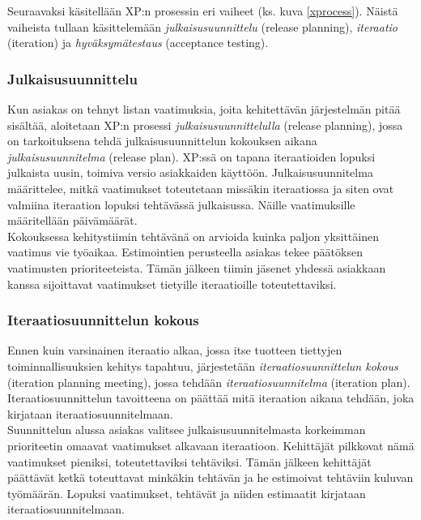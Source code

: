 \documentclass[finnish]{../tktltiki2}
\theoremstyle{definition}
\theoremstyle{remark}
\begin{document}
Seuraavaksi käsitellään XP:n prosessin eri vaiheet (ks. kuva \ref{xprocess}). Näistä vaiheista tullaan käsittelemään \emph{julkaisusuunnittelu} (release planning), \emph{iteraatio} (iteration) ja \emph{hyväksymätestaus} (acceptance testing).

\subsubsection{Julkaisusuunnittelu}

Kun asiakas on tehnyt listan vaatimuksia, joita kehitettävän järjestelmän pitää sisältää, aloitetaan XP:n prosessi \emph{julkaisusuunnittelulla} (release planning),
jossa on tarkoituksena tehdä julkaisusuunnittelun kokouksen aikana \emph{julkaisusuunnitelma} (release plan). XP:ssä on tapana iteraatioiden lopuksi julkaista uusin, toimiva versio asiakkaiden käyttöön. Julkaisusuunnitelma määrittelee, mitkä vaatimukset toteutetaan missäkin iteraatiossa ja siten ovat valmiina iteraation lopuksi tehtävässä julkaisussa. Näille vaatimuksille määritellään päivämäärät.\\

Kokouksessa kehitystiimin tehtävänä on arvioida kuinka paljon yksittäinen vaatimus vie työaikaa. Estimointien perusteella asiakas
tekee päätök\-sen vaatimusten prioriteeteista. Tämän jälkeen tiimin jäsenet
yhdessä asiakkaan kanssa sijoittavat vaatimukset tietyille iteraatioille toteutettaviksi.

\subsubsection{Iteraatiosuunnittelun kokous}

Ennen kuin varsinainen iteraatio alkaa, jossa itse tuotteen tiettyjen toiminnallisuuksien
kehitys tapahtuu, järjestetään \emph{iteraatiosuunnittelun kokous} (iteration planning meeting), jossa tehdään \emph{iteraatiosuunnitelma} (iteration plan). Iteraatiosuunnittelun tavoitteena on päättää mitä iteraation aikana tehdään, joka kirjataan iteraatiosuunnitelmaan.\\

Suunnittelun alussa asiakas valitsee julkaisusuunnitelmasta korkeimman prioriteetin omaavat vaatimukset alkavaan iteraatioon. Kehittäjät pilkkovat nämä vaatimukset pieniksi, toteutettaviksi tehtäviksi. Tämän jälkeen kehittäjät päättävät ketkä toteuttavat minkäkin tehtävän ja he estimoivat tehtäviin kuluvan työmäärän. Lopuksi vaatimukset, tehtävät ja niiden estimaatit kirjataan iteraatiosuunnitelmaan.
\end{document}
